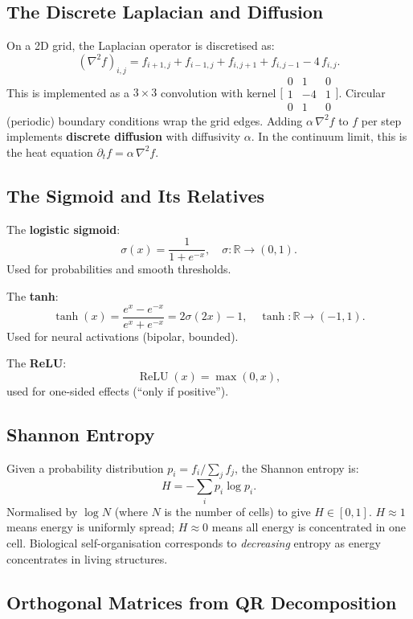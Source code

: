 \documentclass[12pt,a4paper]{article}
\newcommand{\RR}{\mathbb{R}}
\DeclareMathOperator{\relu}{ReLU}
\begin{document}
\subsection{The Discrete Laplacian and Diffusion}

On a 2D grid, the Laplacian operator is discretised as:
\[
  (\nabla^2 f)_{i,j} = f_{i+1,j} + f_{i-1,j}
    + f_{i,j+1} + f_{i,j-1} - 4\,f_{i,j}.
\]
This is implemented as a $3\times3$ convolution with kernel
$\bigl[\begin{smallmatrix}0&1&0\\1&-4&1\\0&1&0\end{smallmatrix}\bigr]$.
Circular (periodic) boundary conditions wrap the grid edges.
Adding $\alpha\,\nabla^2 f$ to $f$ per step implements
\textbf{discrete diffusion} with diffusivity $\alpha$.
In the continuum limit, this is the heat equation
$\partial_t f = \alpha\,\nabla^2 f$.

\subsection{The Sigmoid and Its Relatives}

The \textbf{logistic sigmoid}:
\[
  \sigma(x) = \frac{1}{1+e^{-x}},\quad
  \sigma : \RR \to (0,1).
\]
Used for probabilities and smooth thresholds.

The \textbf{tanh}:
\[
  \tanh(x) = \frac{e^x - e^{-x}}{e^x + e^{-x}} = 2\sigma(2x) - 1,
  \quad \tanh : \RR \to (-1,1).
\]
Used for neural activations (bipolar, bounded).

The \textbf{ReLU}:
\[
  \relu(x) = \max(0, x),
\]
used for one-sided effects (``only if positive'').

\subsection{Shannon Entropy}

Given a probability distribution $p_i = f_i / \sum_j f_j$,
the Shannon entropy is:
\[
  H = -\sum_i p_i \log p_i.
\]
Normalised by $\log N$ (where $N$ is the number of cells)
to give $H \in [0,1]$.
$H\approx 1$ means energy is uniformly spread;
$H \approx 0$ means all energy is concentrated in one cell.
Biological self-organisation corresponds to
\emph{decreasing} entropy as energy concentrates in living structures.

\subsection{Orthogonal Matrices from QR Decomposition}
\end{document}

